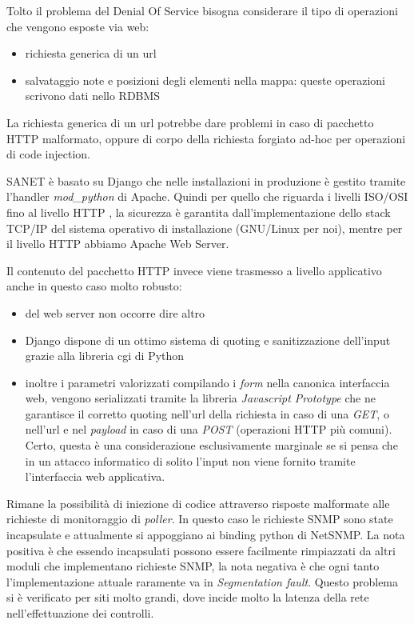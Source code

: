 \documentclass[a4wide,10pt,italian]{manual}
\begin{document}
Tolto il problema del Denial Of Service bisogna considerare il tipo di operazioni che vengono esposte via web:
\begin{itemize}
\item {} 
richiesta generica di un url

\item {} 
salvataggio note e posizioni degli elementi nella mappa: queste operazioni scrivono dati nello RDBMS

\end{itemize}

La richiesta generica di un url potrebbe dare problemi in caso di pacchetto HTTP malformato,
oppure di corpo della richiesta forgiato ad-hoc per operazioni di code injection.

SANET è basato su Django che nelle installazioni in produzione è gestito tramite l'handler \emph{mod\_python} di Apache.
Quindi per quello che riguarda i livelli ISO/OSI fino al livello HTTP , la sicurezza è garantita dall'implementazione
dello stack TCP/IP del sistema operativo di installazione (GNU/Linux per noi), mentre per il livello HTTP abbiamo Apache Web Server.

Il contenuto del pacchetto HTTP invece viene trasmesso a livello applicativo anche in questo caso molto robusto:
\begin{itemize}
\item {} 
del web server non occorre dire altro

\item {} 
Django dispone di un ottimo sistema di quoting e sanitizzazione dell'input grazie alla libreria cgi di Python

\item {} 
inoltre i parametri valorizzati compilando i \emph{form} nella canonica interfaccia web, vengono serializzati tramite la libreria \emph{Javascript Prototype} che ne garantisce il corretto quoting nell'url della richiesta in caso di una \emph{GET}, o nell'url e nel \emph{payload} in caso di una \emph{POST} (operazioni HTTP più comuni). Certo, questa è una considerazione esclusivamente marginale se si pensa che in un attacco informatico di solito l'input non viene fornito tramite l'interfaccia web applicativa.

\end{itemize}

Rimane la possibilità di iniezione di codice attraverso risposte malformate alle richieste di monitoraggio di \emph{poller}.
In questo caso le richieste SNMP sono state incapsulate e attualmente si appoggiano ai binding python di NetSNMP.
La nota positiva è che essendo incapsulati possono essere facilmente rimpiazzati da altri moduli che implementano richieste SNMP,
la nota negativa è che ogni tanto l'implementazione attuale raramente va in \emph{Segmentation fault}. Questo problema si è verificato
per siti molto grandi, dove incide molto la latenza della rete nell'effettuazione dei controlli.
\end{document}
